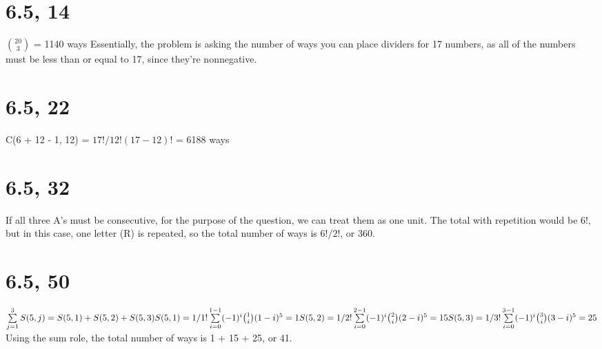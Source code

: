 \documentclass{article}
\begin{document}
\section{6.5, 14}
${20 \choose 3}$ = 1140 ways
\newline
Essentially, the problem is asking the number of ways you can place dividers for 17 numbers, as all of the numbers must be less than or equal to 17, since they're nonnegative.

\section{6.5, 22}
C(6 + 12 - 1, 12) = $17!/12!(17 - 12)!$ = 6188 ways

\section{6.5, 32}
If all three A's must be consecutive, for the purpose of the question, we can treat them as one unit. The total with repetition would be $6!$, but in this case, one letter (R) is repeated, so the total number of ways is $6!/2!$, or 360.

\section{6.5, 50}
$\sum\limits_{j = 1}^3 S(5, j) = S(5, 1) + S(5, 2) + S(5, 3)
\newline
S(5, 1) = 1/1! \sum\limits_{i = 0}^{1 - 1} (-1)^i {1 \choose i} (1 - i)^5 = 1
\newline
S(5, 2) = 1/2! \sum\limits_{i = 0}^{2 - 1} (-1)^i {2 \choose i} (2 - i)^5 = 15
\newline
S(5, 3) = 1/3! \sum\limits_{i = 0}^{3 - 1} (-1)^i {3 \choose i} (3 - i)^5 = 25$
\newline
Using the sum role, the total number of ways is 1 + 15 + 25, or 41.
\end{document}
